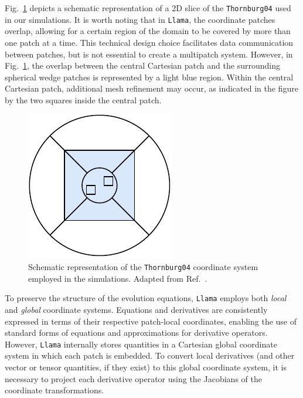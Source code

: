 Fig.~\ref{fig:wave_scattering_multipatch_coords} depicts a schematic representation of a 2D slice of the \texttt{Thornburg04} used in our simulations. It is worth noting that in \texttt{Llama}, the coordinate patches overlap, allowing for a certain region of the domain to be covered by more than one patch at a time. This technical design choice facilitates data communication between patches, but is not essential to create a multipatch system. However, in Fig.~\ref{fig:wave_scattering_multipatch_coords}, the overlap between the central Cartesian patch and the surrounding spherical wedge patches is represented by a light blue region. Within the central Cartesian patch, additional mesh refinement may occur, as indicated in the figure by the two squares inside the central patch.

\begin{figure}[h]
  \centering
  \includegraphics[width=0.60\linewidth]{img/wave_scattering/multipatch_coords}
  \caption{Schematic representation of the \texttt{Thornburg04} coordinate system employed in the simulations. Adapted from Ref.~\cite{Reisswig2010}.}
  \label{fig:wave_scattering_multipatch_coords}
\end{figure}

To preserve the structure of the evolution equations, \texttt{Llama} employs both \textit{local} and \textit{global} coordinate systems. Equations and derivatives are consistently expressed in terms of their respective patch-local coordinates, enabling the use of standard forms of equations and approximations for derivative operators. However, \texttt{Llama} internally stores quantities in a Cartesian global coordinate system in which each patch is embedded. To convert local derivatives (and other vector or tensor quantities, if they exist) to this global coordinate system, it is necessary to project each derivative operator using the Jacobians of the coordinate transformations.

